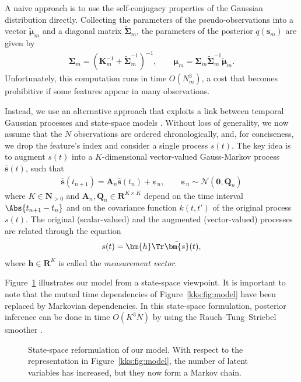 A naive approach is to use the self-conjugacy properties of the Gaussian distribution directly.
Collecting the parameters of the pseudo-observations into a vector $\tilde{\bm{\mu}}_m$ and a diagonal matrix $\tilde{\bm{\Sigma}}_m$, the parameters of the posterior $q(\bm{s}_m)$ are given by
\begin{align}
\label{kks:eq:batch}
\bm{\Sigma}_m = (\bm{K}_m^{-1} + \tilde{\bm{\Sigma}}_m^{-1})^{-1}, \qquad
\bm{\mu}_m    = \bm{\Sigma}_m \tilde{\bm{\Sigma}}_m^{-1} \tilde{\bm{\mu}}_m.
\end{align}
Unfortunately, this computation runs in time $O(N_m^3)$, a cost that becomes prohibitive if some features appear in many observations.

Instead, we use an alternative approach that exploits a link between temporal Gaussian processes and state-space models \citep{hartikainen2010kalman, reece2010introduction}.
Without loss of generality, we now assume that the $N$ observations are ordered chronologically, and, for conciseness, we drop the feature's index and consider a single process $s(t)$.
The key idea is to augment $s(t)$ into a $K$-dimensional vector-valued Gauss-Markov process $\bar{\bm{s}}(t)$, such that
\begin{align*}
\bar{\bm{s}}(t_{n+1}) = \bm{A}_n \bar{\bm{s}}(t_n) + \bm{\varepsilon}_n,
    \qquad \bm{\varepsilon}_n \sim \mathcal{N}(\bm{0}, \bm{Q}_n)
\end{align*}
where $K \in \mathbf{N}_{>0}$ and $\bm{A}_n, \bm{Q}_n \in \mathbf{R}^{K \times K}$ depend on the time interval $\Abs{t_{n+1} - t_n}$ and on the covariance function $k(t, t')$ of the original process $s(t)$.
The original (scalar-valued) and the augmented (vector-valued) processes are related through the equation
\begin{align*}
s(t) = \bm{h}\Tr \bar{\bm{s}}(t),
\end{align*}
where $\bm{h} \in \mathbf{R}^K$ is called the \emph{measurement vector}.

Figure~\ref{kks:fig:ssm} illustrates our model from a state-space viewpoint.
It is important to note that the mutual time dependencies of Figure~\ref{kks:fig:model} have been replaced by Markovian dependencies.
In this state-space formulation, posterior inference can be done in time $O(K^3 N)$ by using the Rauch--Tung--Striebel smoother \citep{sarkka2013bayesian}.

\begin{figure}[t]
  \centering
  
  \caption{State-space reformulation of our model.
  With respect to the representation in Figure~\ref{kks:fig:model}, the number of latent variables has increased, but they now form a Markov chain.}
  \label{kks:fig:ssm}
\end{figure}

